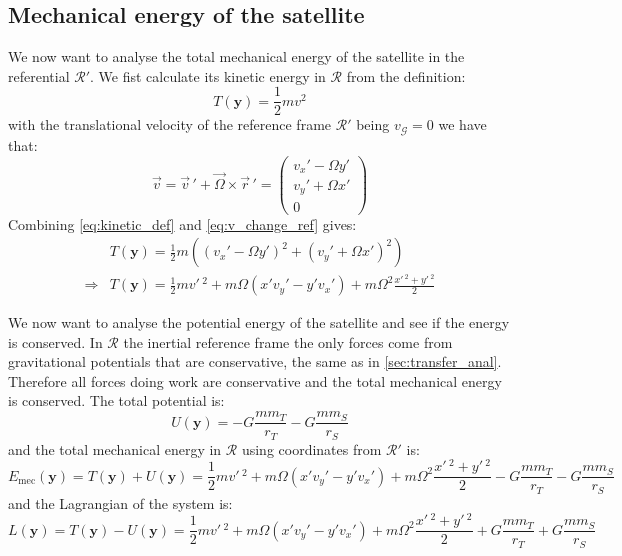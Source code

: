 \subsection{Mechanical energy of the satellite}
We now want to analyse the total mechanical energy of the satellite in the referential $\mathcal{R}'$. We fist calculate its kinetic energy in $\mathcal{R}$ from the definition:
\begin{equation}
    T(\mathbf{y}) = \frac{1}{2}m v^2
    \label{eq:kinetic_def}
\end{equation}
with the translational velocity of the reference frame $\mathcal{R}'$ being $v_{\mathcal{G}} = 0$ we have that:
\begin{equation}
    \vec{v} = \vec{v}\,' + \vec{\Omega}\times\vec{r}\,' = \left(\begin{matrix} v_x' - \Omega y' \\ v_y' + \Omega x' \\ 0 \end{matrix}\right)
    \label{eq:v_change_ref}
\end{equation}
Combining \autoref{eq:kinetic_def} and \autoref{eq:v_change_ref} gives:
\begin{equation}
    \begin{aligned}
        & T(\mathbf{y}) = \frac{1}{2}m\left((v_x' - \Omega y')^2 + (v_y' + \Omega x')^2\right) \\
        \Rightarrow & T(\mathbf{y}) = \frac{1}{2}mv'\,^2 + m\Omega(x'v_y' - y'v_x') + m\Omega^2\frac{x'\,^2 + y'\,^2}{2}
    \end{aligned}
    \label{eq:kinetic_frame_rot}
\end{equation}

We now want to analyse the potential energy of the satellite and see if the energy is conserved. In $\mathcal{R}$ the inertial reference frame the only forces come from gravitational potentials that are conservative, the same as in \autoref{sec:transfer_anal}. Therefore all forces doing work are conservative and the total mechanical energy is conserved. The total potential is:
\begin{equation}
    U(\mathbf{y}) = - G \frac{mm_T}{r_T} - G \frac{mm_S}{r_S}
\end{equation}
and the total mechanical energy in $\mathcal{R}$ using coordinates from $\mathcal{R}'$ is:
\begin{equation}
    E_\mathrm{mec}(\mathbf{y}) = T(\mathbf{y}) + U(\mathbf{y}) = \frac{1}{2}mv'\,^2 + m\Omega(x'v_y' - y'v_x') + m\Omega^2\frac{x'\,^2 + y'\,^2}{2} - G \frac{mm_T}{r_T} - G \frac{mm_S}{r_S}
\end{equation}
and the Lagrangian of the system is:
\begin{equation}
    L(\mathbf{y}) = T(\mathbf{y}) - U(\mathbf{y}) = \frac{1}{2}mv'\,^2 + m\Omega(x'v_y' - y'v_x') + m\Omega^2\frac{x'\,^2 + y'\,^2}{2} + G \frac{mm_T}{r_T} + G \frac{mm_S}{r_S}
\end{equation}

